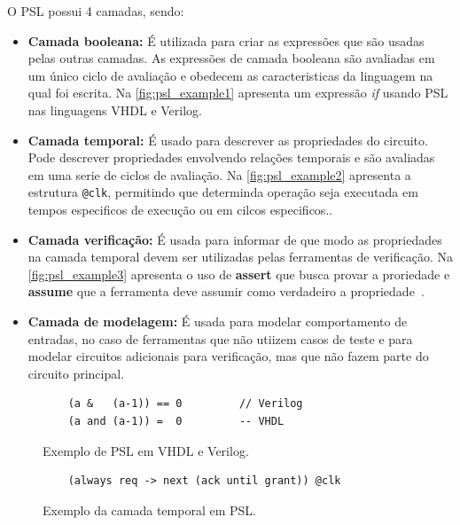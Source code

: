 \par
O PSL possui 4 camadas, sendo:
\begin{itemize}
    \item \textbf{Camada booleana:} É utilizada para criar as expressões que são usadas pelas outras camadas. As expressões de camada booleana são avaliadas em um único ciclo de avaliação e obedecem as caracteristicas da linguagem na qual foi escrita. Na \autoref{fig:psl_example1} apresenta um expressão \textit{if} usando PSL nas linguagens VHDL e Verilog\cite{IEEEPSL}.
    \item \textbf{Camada temporal:} É usado para descrever as propriedades do circuito. Pode descrever propriedades envolvendo relações temporais e são avaliadas em uma serie de ciclos de avaliação. Na \autoref{fig:psl_example2} apresenta a estrutura \texttt{@clk}, permitindo que determinda operação seja executada em tempos especificos de execução ou em cilcos especificos.\cite{IEEEPSL}.
    \item \textbf{Camada verificação:} É usada para informar de que modo as propriedades na camada temporal devem ser utilizadas pelas ferramentas de verificação. Na \autoref{fig:psl_example3} apresenta o uso de \textbf{assert} que busca provar a proriedade e \textbf{assume} que a ferramenta deve assumir como verdadeiro a propriedade~\cite{IEEEPSL}.
    \item \textbf{Camada de modelagem:} É usada para modelar comportamento de entradas, no caso de ferramentas que não utiizem casos de teste e para modelar circuitos adicionais para verificação, mas que não fazem parte do circuito principal\cite{IEEEPSL}.
\end{itemize}

\begin{figure}[H]
\caption{\label{fig:psl_example1} Exemplo de PSL em VHDL e Verilog.}
	\begin{center}
    \begin{minipage}{0.7\textwidth}
    \begin{lstlisting}       
    (a &   (a-1)) == 0         // Verilog
    (a and (a-1)) =  0         -- VHDL
    \end{lstlisting}
    \end{minipage}
	\end{center}
\end{figure}

\begin{figure}[H]
\caption{\label{fig:psl_example2} Exemplo da camada temporal em PSL.}
	\begin{center}
    \begin{minipage}{0.7\textwidth}
    \begin{lstlisting}       
    (always req -> next (ack until grant)) @clk
    \end{lstlisting}
    \end{minipage}
	\end{center}
\end{figure}


